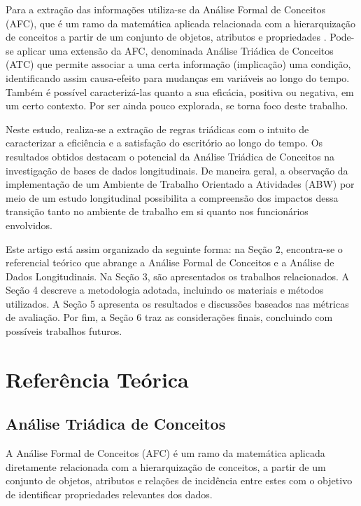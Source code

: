 \documentclass[kdmile,a4paper]{kdmile} %
\begin{document}
Para a extração das informações utiliza-se da Análise Formal de Conceitos (AFC), que é um ramo da matemática aplicada  relacionada com a hierarquização de conceitos a partir de um conjunto de objetos, atributos e propriedades \cite{ganter1999formal}. Pode-se aplicar uma extensão da AFC, denominada Análise Triádica de Conceitos (ATC) que permite associar a uma certa informação (implicação) uma condição, identificando assim causa-efeito para mudanças em variáveis ao longo do tempo. Também é possível caracterizá-las quanto a sua eficácia, positiva ou negativa, em um certo contexto. Por ser ainda pouco explorada, se torna foco deste trabalho.

Neste estudo, realiza-se a extração de regras triádicas com o intuito de caracterizar a eficiência e a satisfação do escritório ao longo do tempo. Os resultados obtidos destacam o potencial da Análise Triádica de Conceitos \cite{inproceedings} na investigação de bases de dados longitudinais. De maneira geral, a observação da implementação de um Ambiente de Trabalho Orientado a Atividades (ABW) por meio de um estudo longitudinal possibilita a compreensão dos impactos dessa transição tanto no ambiente de trabalho em si quanto nos funcionários envolvidos.

Este artigo está assim organizado da seguinte forma: na Seção 2, encontra-se o referencial teórico que abrange a Análise Formal de Conceitos e a Análise de Dados Longitudinais. Na Seção 3, são apresentados os trabalhos relacionados. A Seção 4 descreve a metodologia adotada, incluindo os materiais e métodos utilizados. A Seção 5 apresenta os resultados e discussões baseados nas métricas de avaliação. Por fim, a Seção 6 traz as considerações finais, concluindo com possíveis trabalhos futuros.


 \section{Referência Teórica}

 \subsection{Análise Triádica de Conceitos}

 A Análise Formal de Conceitos (AFC) é um ramo da matemática aplicada diretamente relacionada com a hierarquização de conceitos, a partir de um conjunto de objetos, atributos e relações de incidência entre estes \cite{ganter1999formal} com o objetivo de identificar propriedades relevantes dos dados.
\end{document}
